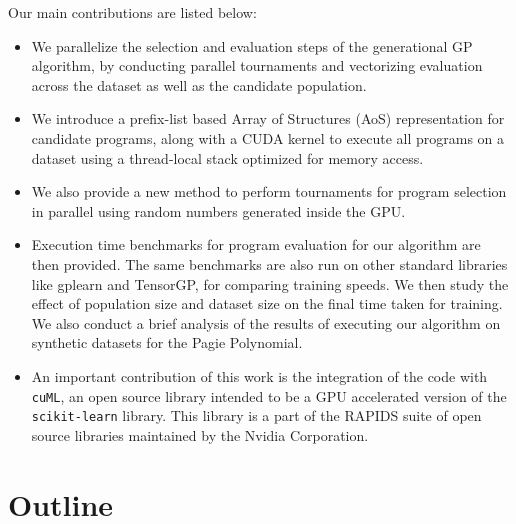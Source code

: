 Our main contributions are listed below:
\begin{itemize}
  \item We parallelize the selection and evaluation steps of the generational GP algorithm, by conducting parallel tournaments and vectorizing evaluation across the dataset as well as the candidate population. 
  \item We introduce a prefix-list based Array of Structures (AoS) representation for candidate programs, along with a CUDA kernel to execute all programs on a dataset using a thread-local stack optimized for memory access. 
  \item We also provide a new method to perform tournaments for program selection in parallel using random numbers generated inside the GPU. 
  \item Execution time benchmarks for program evaluation for our algorithm are then provided. The same benchmarks are also run on other standard libraries like gplearn\citep{gplearn} and TensorGP\citep{baeta2021tensorgp}, for comparing training speeds. We then study the effect of population size and dataset size on the final time taken for training. We also conduct a brief analysis of the results of executing our algorithm on synthetic datasets for the Pagie Polynomial\cite{Pagie1997}.
  \item An important contribution of this work is the integration of the code with \texttt{cuML}\citep{raschka2020machine}, an open source library intended to be a GPU accelerated version of the \texttt{scikit-learn}\citep{scikit-learn} library. This library is a part of the RAPIDS suite of open source libraries maintained by the Nvidia Corporation. 
\end{itemize}


\section{Outline}
\label{intro:outline}

